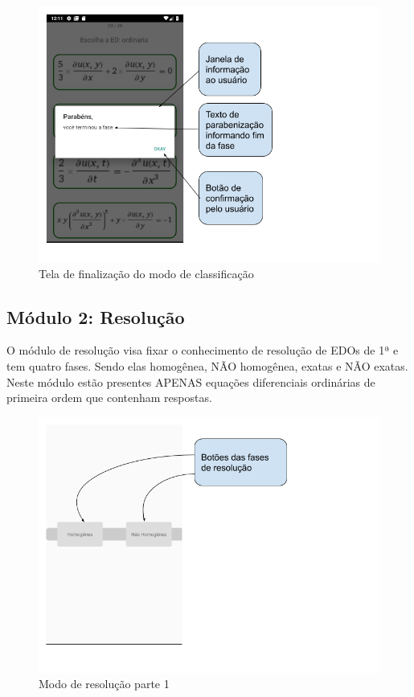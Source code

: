 \begin{figure}[H]
\centering
\caption{Tela de finalização do modo de classificação}
\includegraphics[scale=0.52]{figuras/fim_fase.png}
\end{figure}

\subsection[Módulo 2: Resolução]{Módulo 2: Resolução}

O módulo de resolução visa fixar o conhecimento de resolução de EDOs de 1ª e tem quatro fases. Sendo elas homogênea, NÃO homogênea, exatas e NÃO exatas. Neste módulo estão presentes APENAS equações diferenciais ordinárias de primeira ordem que contenham respostas. 

\begin{figure}[H]
\centering
\caption{Modo de resolução parte 1}
\includegraphics[scale=0.52]{figuras/modo_resolucao_1.png}
\end{figure}


